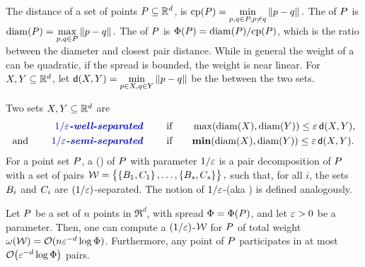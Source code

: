 \documentclass[12pt]{article}%
\begin{document}
The  distance of a set of points
$P \subseteq \mathbb{R}^d$, is
\begin{math}
    \cpX{\PS} = \underset{\pa, \pb \in \PS, \pa \neq \pb}{\min}
    \dY{\pa}{\pb}.
\end{math}
The  of $P$ is
\begin{math}
    \diamX{\PS} = \underset{\pa, \pb \in \PS}{\max}\dY{\pa}{\pb}.
\end{math}
The  of $P$ is
$\spreadX{\PS} = \diamX{\PS} / \cpX{\PS}$, which is the ratio between
the diameter and closest pair distance.  While in general the weight
of a \WSPD can be quadratic, if the spread is bounded, the weight is
near linear.  For $X, Y \subseteq \mathbb{R}^d$, let
$\dsY{\PSX}{\PSY} = \underset{\pa \in \PSX, \pb \in \PSY}{\min}
\dY{\pa}{\pb}$ be the  between the two sets.


\begin{defn}
    Two sets $X, Y \subseteq \mathbb{R}^d$ are 
    \begin{align*}
      \text{\emphi{$1/\eps$-well-separated}}
      \qquad
      &\text{if}\qquad
        \max \pth{ \diameterX{\PSX}, \diameterX{\PSY} } \leq
        \eps \, \dsY{\PSX}{\PSY},
      \\
      \text{and} \qquad \text{\emphi{$1/\eps$-semi-separated}}
      \qquad
      &\text{if}\qquad
        \mathbf{min} \pth{ \diameterX{\PSX}, \diameterX{\PSY} }
        \leq
        \eps \, \dsY{\PSX}{\PSY}.
    \end{align*}
    For a point set $P$, a  (\emphOnly{\WSPD{}}) of $P$ with parameter
    $1/\varepsilon$ is a pair decomposition of $P$ with a set of pairs
    \begin{math}
        \mathcal{W} = \left\{ {\bigl.
           \left\{ {B_1,C_1} \right\},\ldots,\left\{ {B_s,C_s} \right\}} \right\},
    \end{math}
    such that, for all $i$, the sets $B_i$ and $C_i$ are
    $(1/\varepsilon)$-separated. The notion of $1/\varepsilon$-\SSPD (aka
    ) is defined
    analogously.
\end{defn}


\begin{lemma}
    Let $P$ be a set of $n$ points in $\Re^d$, with spread
    $\spread = \spreadX{\PS}$, and let $\varepsilon > 0$ be a
    parameter. Then, one can compute a $(1/\varepsilon)$-\WSPD $\mathcal{W}$ for
    $P$ of total weight
    $\WeightX{\WS} = \Of(n \eps^{-d} \log \spread)$. Furthermore, any
    point of $P$ participates in at most
    $\Of\pth{ \eps^{-d} \log \spread}$ pairs.
\end{lemma}
\end{document}
